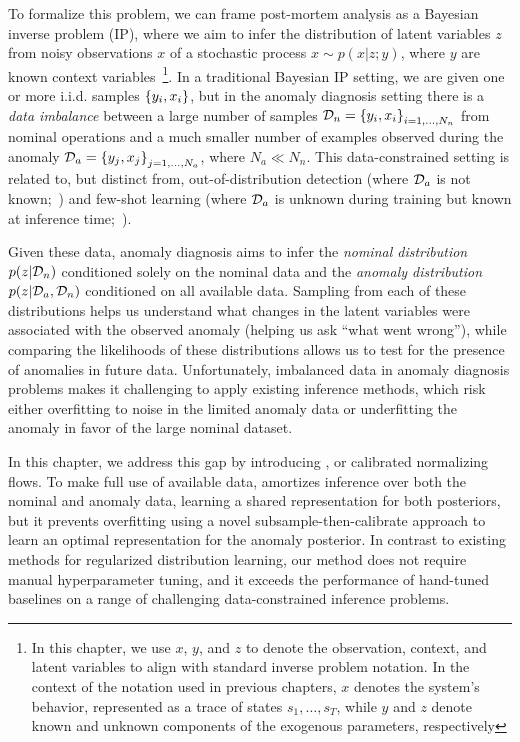 To formalize this problem, we can frame post-mortem analysis as a Bayesian inverse problem (IP), where we aim to infer the distribution of latent variables $z$ from noisy observations $x$ of a stochastic process $x \sim p(x | z; y)$, where $y$ are known context variables~\cite{stuartInverseProblemsBayesian2010,molinaroNeuralInverseOperators2023,liuOptimizationAmortizedInverse2023,asimInvertibleGenerativeModels2020}\footnote{In this chapter, we use $x$, $y$, and $z$ to denote the observation, context, and latent variables to align with standard inverse problem notation. In the context of the notation used in previous chapters, $x$ denotes the system's behavior, represented as a trace of states $s_1, \ldots, s_T$, while $y$ and $z$ denote known and unknown components of the exogenous parameters, respectively}.
%
In a traditional Bayesian IP setting, we are given one or more i.i.d. samples $\left\{y_i, x_i\right\}$, but in the anomaly diagnosis setting there is a \textit{data imbalance} between a large number of samples $\mathcal{D}_n = \left\{y_i, x_i\right\}_{i=1, \ldots, N_n}$ from nominal operations and a much smaller number of examples observed during the anomaly $\mathcal{D}_a = \left\{y_j, x_j\right\}_{j=1, \ldots, N_a}$, where $N_a \ll N_n$. This data-constrained setting is related to, but distinct from, out-of-distribution detection (where $\mathcal{D}_a$ is not known;~\cite{liangEnhancingReliabilityOutofdistribution2020,hendrycksDeepAnomalyDetection2018,kirichenkoWhyNormalizingFlows2020}) and few-shot learning (where $\mathcal{D}_a$ is unknown during training but known at inference time;~\cite{wangGeneralizingFewExamples2020}).

Given these data, anomaly diagnosis aims to infer the \textit{nominal distribution} $p(z | \mathcal{D}_n)$ conditioned solely on the nominal data and the \textit{anomaly distribution} $p(z | \mathcal{D}_a, \mathcal{D}_n)$ conditioned on all available data. Sampling from each of these distributions helps us understand what changes in the latent variables were associated with the observed anomaly (helping us ask ``what went wrong''), while comparing the likelihoods of these distributions allows us to test for the presence of anomalies in future data. Unfortunately, imbalanced data in anomaly diagnosis problems makes it challenging to apply existing inference methods, which risk either overfitting to noise in the limited anomaly data or underfitting the anomaly in favor of the large nominal dataset.

In this chapter, we address this gap by introducing \ouralg, or calibrated normalizing flows. To make full use of available data, \ouralg{} amortizes inference over both the nominal and anomaly data, learning a shared representation for both posteriors, but it prevents overfitting using a novel subsample-then-calibrate approach to learn an optimal representation for the anomaly posterior.
%
In contrast to existing methods for regularized distribution learning, our method does not require manual hyperparameter tuning, and it exceeds the performance of hand-tuned baselines on a range of challenging data-constrained inference problems.

